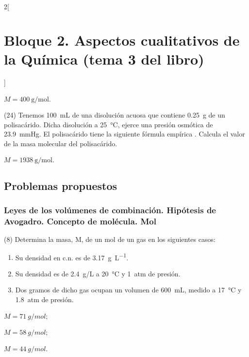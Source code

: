 \documentclass[10pt]{article}
\begin{document}
\begin{multicols}{2}[
    \section{Bloque 2. Aspectos cualitativos de la Química (tema 3 del libro)}
  ]
\begin{solution}
  \( M = \SI{400}{\gram\per\mole} \).
\end{solution}




\begin{exercise}[
    tags    = {},
    topics  = {química,química básica},
    source  = {FQ 1B MGH 2016, p80, e24},
  ]
  (24) Tenemos \SI{100}{\milli\liter} de una disolución acuosa que contiene \SI{0.25}{\gram} de un polisacárido. Dicha disolución a \SI{25}{\celsius}, ejerce una presión osmótica de \SI{23.9}{\mmHg}. El polisacárido tiene la siguiente fórmula empírica . Calcula el valor de la masa molecular del polisacárido.
\end{exercise}

\begin{solution}
  \( M = \SI{1938}{\gram\per\mole} \).
\end{solution}







\subsection{Problemas propuestos}

\subsubsection{Leyes de los volúmenes de combinación. Hipótesis de Avogadro. Concepto de molécula. Mol}

\begin{exercise}[
    tags    = {},
    topics  = {química,química básica},
    source  = {FQ 1B MGH 2016, p83, e8},
  ]
  (8) Determina la masa, M, de un mol de un gas en los siguientes
  casos:
  \begin{enumerate}
    \item Su densidad en c.n. es de \SI{3.17}{\gram\per\liter}.
    \item Su densidad es de \SI{2.4}{g/L} a \SI{20}{\celsius} y \SI{1}{atm} de presión.
    \item Dos gramos de dicho gas ocupan un volumen de \SI{600}{\milli\liter}, medido a \SI{17}{\celsius} y \SI{1.8}{atm} de presión.
  \end{enumerate}
\end{exercise}

\begin{solution}
  \begin{enumerate*}
    \item \( M = \SI{71}{g/mol} \);
    \item \( M = \SI{58}{g/mol} \);
    \item \( M = \SI{44}{g/mol} \).
    \end{enumerate*}
\end{solution}





\end{multicols}
\end{document}
